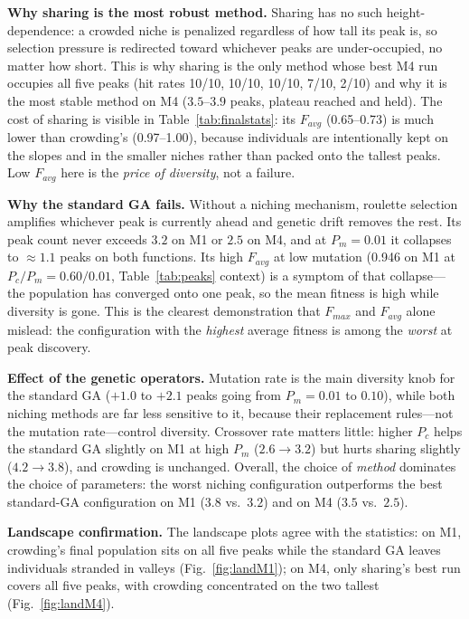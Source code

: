 \documentclass[conference]{IEEEtran}
\begin{document}
\textbf{Why sharing is the most robust method.} Sharing has no such
height-dependence: a crowded niche is penalized regardless of how tall its
peak is, so selection pressure is redirected toward whichever peaks are
under-occupied, no matter how short. This is why sharing is the only method
whose best M4 run occupies all five peaks (hit rates 10/10, 10/10, 10/10,
7/10, 2/10) and why it is the most stable method on M4
($3.5$--$3.9$ peaks, plateau reached and held). The cost of sharing is
visible in Table~\ref{tab:finalstats}: its $F_{avg}$ (0.65--0.73) is much
lower than crowding's (0.97--1.00), because individuals are intentionally
kept on the slopes and in the smaller niches rather than packed onto the
tallest peaks. Low $F_{avg}$ here is the \emph{price of diversity}, not a
failure.

\textbf{Why the standard GA fails.} Without a niching mechanism, roulette
selection amplifies whichever peak is currently ahead and genetic drift
removes the rest. Its peak count never exceeds $3.2$ on M1 or $2.5$ on M4,
and at $P_m=0.01$ it collapses to $\approx 1.1$ peaks on both functions.
Its high $F_{avg}$ at low mutation (0.946 on M1 at $P_c/P_m=0.60/0.01$,
Table~\ref{tab:peaks} context) is a symptom of that collapse---the
population has converged onto one peak, so the mean fitness is high while
diversity is gone. This is the clearest demonstration that $F_{max}$ and
$F_{avg}$ alone mislead: the configuration with the \emph{highest} average
fitness is among the \emph{worst} at peak discovery.

\textbf{Effect of the genetic operators.} Mutation rate is the main diversity
knob for the standard GA ($+1.0$ to $+2.1$ peaks going from $P_m=0.01$ to
$0.10$), while both niching methods are far less sensitive to it, because
their replacement rules---not the mutation rate---control diversity. Crossover
rate matters little: higher $P_c$ helps the standard GA slightly on M1 at
high $P_m$ ($2.6 \rightarrow 3.2$) but hurts sharing slightly
($4.2 \rightarrow 3.8$), and crowding is unchanged. Overall, the choice of
\emph{method} dominates the choice of parameters: the worst niching
configuration outperforms the best standard-GA configuration on M1
($3.8$ vs.\ $3.2$) and on M4 ($3.5$ vs.\ $2.5$).

\textbf{Landscape confirmation.} The landscape plots agree with the
statistics: on M1, crowding's final population sits on all five peaks while
the standard GA leaves individuals stranded in valleys
(Fig.~\ref{fig:landM1}); on M4, only sharing's best run covers all five
peaks, with crowding concentrated on the two tallest
(Fig.~\ref{fig:landM4}).
\end{document}
